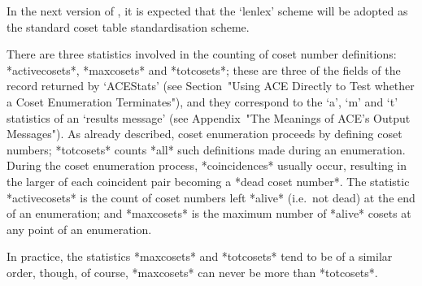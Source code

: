 In the next version of {\GAP}, it is expected that the `lenlex' scheme
will be adopted as the standard  {\GAP}  coset  table  standardisation
scheme.


There are three statistics involved in the counting  of  coset  number
definitions:                       *activecosets*,
*maxcosets* and  *totcosets*;  these
are three of the fields of the  record  returned  by  `ACEStats'  (see
Section~"Using ACE  Directly  to  Test  whether  a  Coset  Enumeration
Terminates"), and they correspond to the `a', `m' and  `t'  statistics
of an {\ACE} \lq{}results  message'  (see  Appendix~"The  Meanings  of
ACE's Output  Messages").  As  already  described,  coset  enumeration
proceeds by defining coset  numbers;  *totcosets*  counts  *all*  such
definitions made during an enumeration. During the  coset  enumeration
process, *coincidences* usually occur, resulting in
the  larger  of  each  coincident  pair   becoming   a   *dead   coset
number*. The  statistic  *activecosets*  is
the count of coset  numbers  left  *alive*
(i.e.~not dead) at the end of an enumeration; and *maxcosets*  is  the
maximum number of *alive* cosets at any point of an enumeration.

In practice, the statistics *maxcosets* and *totcosets* tend to be  of
a similar order, though, of course, *maxcosets* can never be more than
*totcosets*.

